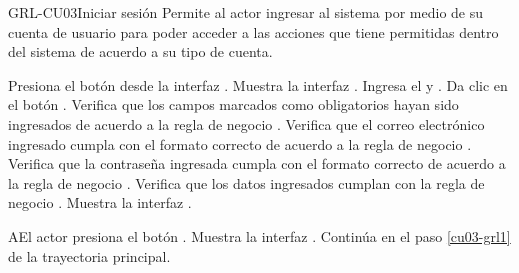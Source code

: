 \begin{UseCase}[]{GRL-CU03}{Iniciar sesión}{
	Permite al actor ingresar al sistema por medio de su cuenta de usuario para poder acceder a las
acciones que tiene permitidas dentro del sistema de acuerdo a su tipo de cuenta.
}
\end{UseCase}

\begin{UCtrayectoria}
	\UCpaso [\UCactor] Presiona el botón  desde la interfaz .
    \UCpaso [\UCsist] Muestra la interfaz .
	\UCpaso [\UCactor] Ingresa el  y .\label{cu03-grl1}
	\UCpaso [\UCactor] Da clic en el botón .   
	\UCpaso [\UCsist] Verifica que los campos marcados como obligatorios hayan sido ingresados de acuerdo a la
	regla de negocio .
	\UCpaso [\UCsist] Verifica que el correo electrónico ingresado cumpla con el formato correcto de acuerdo a la regla de negocio  .  
	\UCpaso [\UCsist] Verifica que la contraseña ingresada cumpla con el formato correcto de acuerdo a la regla de negocio  .
	\UCpaso [\UCsist] Verifica que los datos ingresados cumplan con la regla de negocio . 
    \UCpaso [\UCsist] Muestra la interfaz . %
\end{UCtrayectoria}

\begin{UCtrayectoriaA}{A}{El actor presiona el botón .}
	\UCpaso [\UCsist] Muestra la interfaz .
	\UCpaso [\UCsist] Continúa en el paso \ref{cu03-grl1} de la trayectoria principal.
\end{UCtrayectoriaA}

